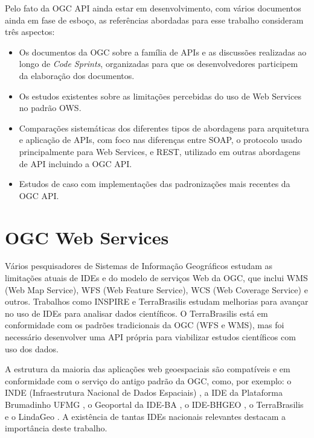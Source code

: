 Pelo fato  da OGC API ainda estar em desenvolvimento, com vários documentos ainda em fase de esboço, as referências abordadas para esse trabalho consideram três aspectos: 

\begin{itemize}
    \item Os documentos da OGC sobre a família de APIs e as discussões realizadas ao longo de \textit{Code Sprints}, organizadas para que os desenvolvedores participem da elaboração dos documentos.
    \item Os estudos existentes sobre as limitações percebidas do uso de Web Services no padrão OWS.
    \item Comparações sistemáticas dos diferentes tipos de abordagens para arquitetura e aplicação de APIs, com foco nas diferenças entre SOAP, o protocolo usado principalmente para Web Services, e REST, utilizado em outras abordagens de API incluindo a OGC API.
    \item Estudos de caso com implementações das padronizações mais recentes da OGC API.
\end{itemize}

\section{OGC Web Services}


Vários pesquisadores de Sistemas de Informação Geográficos estudam as limitações atuais de IDEs e do modelo de serviços Web da OGC, que inclui WMS (Web Map Service), WFS (Web Feature Service), WCS (Web Coverage Service) e outros. Trabalhos como INSPIRE \citep{silvadiretiva} e TerraBrasilis \citep{fg2019terrabrasilis} estudam melhorias para avançar no uso de IDEs para analisar dados científicos. O TerraBrasilis está em conformidade com os padrões tradicionais da OGC (WFS e WMS), mas foi necessário desenvolver uma API própria para viabilizar estudos científicos com uso dos dados. %

A estrutura da maioria das aplicações web geoespaciais são compatíveis e em conformidade com o serviço do antigo padrão da OGC, como, por exemplo: o INDE (Infraestrutura Nacional de Dados Espaciais) \citep{indewms}, a IDE da Plataforma Brumadinho UFMG \citep{brumadinho}, o Geoportal da IDE-BA \citep{ideba}, 
o IDE-BHGEO \citep{bhgeo}, o TerraBrasilis \citep{fg2019terrabrasilis} e o LindaGeo \citep{lindageo}. A existência de tantas IDEs nacionais relevantes destacam a importância deste trabalho.


